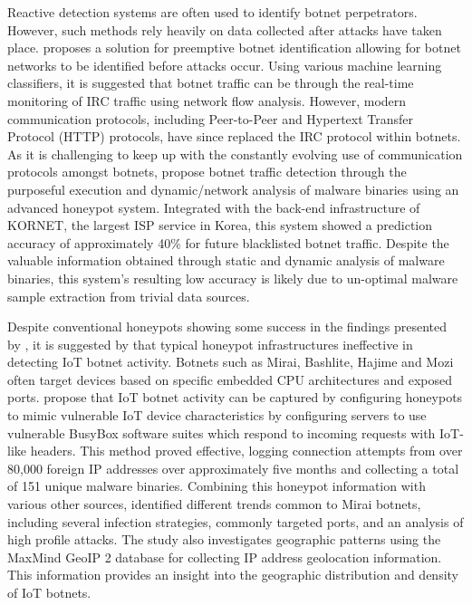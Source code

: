 Reactive detection systems are often used to identify botnet perpetrators. However, such methods rely heavily on data collected after attacks have taken place. \citet{Lividas2006} proposes a solution for preemptive botnet identification allowing for botnet networks to be identified before attacks occur. Using various machine learning classifiers, it is suggested that botnet traffic can be through the real-time monitoring of IRC traffic using network flow analysis. However, modern communication protocols, including Peer-to-Peer and Hypertext Transfer Protocol (HTTP) protocols, have since replaced the IRC protocol within botnets. As it is challenging to keep up with the constantly evolving use of communication protocols amongst botnets, \citet{Moon2012} propose botnet traffic detection through the purposeful execution and dynamic/network analysis of malware binaries using an advanced honeypot system. Integrated with the back-end infrastructure of KORNET, the largest ISP service in Korea, this system showed a prediction accuracy of approximately 40\% for future blacklisted botnet traffic. Despite the valuable information obtained through static and dynamic analysis of malware binaries, this system's resulting low accuracy is likely due to un-optimal malware sample extraction from trivial data sources.

Despite conventional honeypots showing some success in the findings presented by \citet{Moon2012}, it is suggested by \citet{Malwaremustdie2016} that typical honeypot infrastructures ineffective in detecting IoT botnet activity. Botnets such as Mirai, Bashlite, Hajime and Mozi often target devices based on specific embedded CPU architectures and exposed ports. \citet{Antonakakis2017} propose that IoT botnet activity can be captured by configuring honeypots to mimic vulnerable IoT device characteristics by configuring servers to use vulnerable BusyBox software suites which respond to incoming requests with IoT-like headers. This method proved effective, logging connection attempts from over 80,000 foreign IP addresses over approximately five months and collecting a total of 151 unique malware binaries. Combining this honeypot information with various other sources, \citet{Antonakakis2017} identified different trends common to Mirai botnets, including several infection strategies, commonly targeted ports, and an analysis of high profile attacks. The study also investigates geographic patterns using the MaxMind GeoIP 2 database for collecting IP address geolocation information. This information provides an insight into the geographic distribution and density of IoT botnets. 

